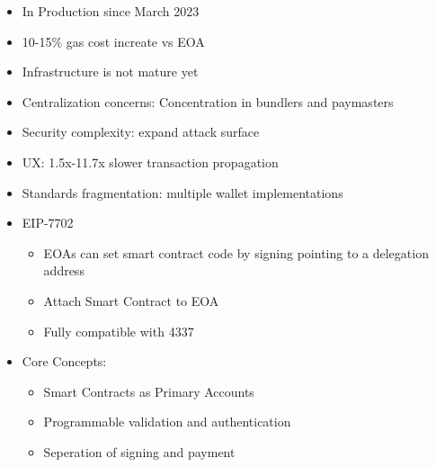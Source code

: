 \documentclass[../Main.tex]{subfiles}
\begin{document}
\begin{itemize}
    \item In Production since March 2023
    \item 10-15\% gas cost increate vs EOA
    \item Infrastructure is not mature yet
    \item Centralization concerns: Concentration in bundlers and paymasters
    \item Security complexity: expand attack surface
    \item UX: 1.5x-11.7x slower transaction propagation
    \item Standards fragmentation: multiple wallet implementations 
    \item EIP-7702
    \begin{itemize}
        \item EOAs can set smart contract code by signing pointing to a delegation address
        \item Attach Smart Contract to EOA
        \item Fully compatible with 4337
    \end{itemize}
\end{itemize}

\begin{itemize}
    \item Core Concepts:
    \begin{itemize}
        \item Smart Contracts as Primary Accounts
        \item Programmable validation and authentication
        \item Seperation of signing and payment
    \end{itemize}
\end{itemize}
\end{document}

